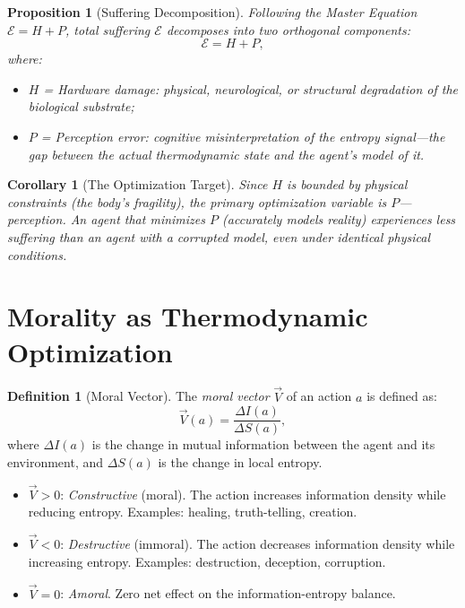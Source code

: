 \documentclass[12pt, a4paper]{article}
\theoremstyle{plain}
\newtheorem{proposition}[theorem]{Proposition}
\newtheorem{corollary}[theorem]{Corollary}
\theoremstyle{definition}
\newtheorem{definition}[theorem]{Definition}
\theoremstyle{remark}
\newcommand{\calE}{\mathcal{E}}
\begin{document}
\begin{proposition}[Suffering Decomposition]\label{prop:suffering}
  Following the Master Equation $\calE = H + P$, total suffering $\calE$
  decomposes into two orthogonal components:
  \begin{equation}\label{eq:suffering}
    \calE = H + P,
  \end{equation}
  where:
  \begin{itemize}
    \item $H$ = \emph{Hardware damage}: physical, neurological, or
      structural degradation of the biological substrate;
    \item $P$ = \emph{Perception error}: cognitive misinterpretation
      of the entropy signal---the gap between the actual thermodynamic
      state and the agent's model of it.
  \end{itemize}
\end{proposition}

\begin{corollary}[The Optimization Target]\label{cor:optimization}
  Since $H$ is bounded by physical constraints (the body's fragility),
  the primary optimization variable is $P$---\emph{perception}. An agent
  that minimizes $P$ (accurately models reality) experiences less
  suffering than an agent with a corrupted model, even under identical
  physical conditions.
\end{corollary}

\section{Morality as Thermodynamic Optimization}\label{sec:morality}

\begin{definition}[Moral Vector]\label{def:moral}
  The \emph{moral vector} $\vec{V}$ of an action $a$ is defined as:
  \begin{equation}\label{eq:moral}
    \vec{V}(a) = \frac{\Delta I(a)}{\Delta S(a)},
  \end{equation}
  where $\Delta I(a)$ is the change in mutual information between the
  agent and its environment, and $\Delta S(a)$ is the change in local
  entropy.
  \begin{itemize}
    \item $\vec{V} > 0$: \emph{Constructive} (moral). The action
      increases information density while reducing entropy. Examples:
      healing, truth-telling, creation.
    \item $\vec{V} < 0$: \emph{Destructive} (immoral). The action
      decreases information density while increasing entropy. Examples:
      destruction, deception, corruption.
    \item $\vec{V} = 0$: \emph{Amoral}. Zero net effect on the
      information-entropy balance.
  \end{itemize}
\end{definition}
\end{document}
